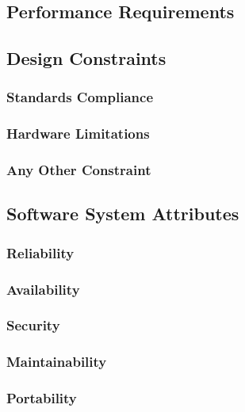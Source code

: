 \subsection{Performance Requirements}
\subsection{Design Constraints}
\subsubsection{Standards Compliance}
\subsubsection{Hardware Limitations}
\subsubsection{Any Other Constraint}
\subsection{Software System Attributes}
\subsubsection{Reliability}
\subsubsection{Availability}
\subsubsection{Security}
\subsubsection{Maintainability}
\subsubsection{Portability}